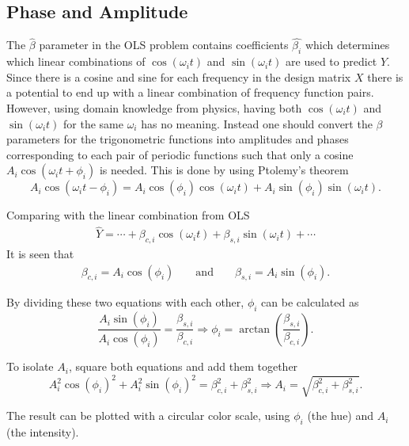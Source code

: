 \subsection{Phase and Amplitude}

The $\hat{\beta}$ parameter in the OLS problem contains coefficients $\hat{\beta_i}$ which determines which linear combinations of $\cos(\omega_i t)$ and $\sin(\omega_i t)$  are used to predict $Y$.
Since there is a cosine and sine for each frequency in the design matrix $X$ there is a potential to end up with a linear combination of frequency function pairs.
However, using domain knowledge from physics, having both $\cos(\omega_i t)$ and $\sin(\omega_i t)$ for the same $\omega_i$ has no meaning.
Instead one should convert the $\beta$ parameters for the trigonometric functions into amplitudes and phases corresponding to each pair of periodic functions such that only a cosine  $A_i \cos(\omega_i t + \phi_i)$ is needed.
This is done by using Ptolemy's theorem
\begin{equation}
A_i \cos(\omega_i t - \phi_i) = A_i \cos(\phi_i) \cos(\omega_i t) + A_i \sin(\phi_i) \sin(\omega_i t).
\end{equation}

Comparing with the linear combination from OLS
\begin{align}
\hat{Y} = \cdots + \beta_{c,i} \cos(\omega_i t) + \beta_{s,i} \sin(\omega_i t) + \cdots
\end{align}
It is seen that
\begin{align}
\beta_{c,i} = A_i \cos(\phi_i) && \text{ and } && \beta_{s,i} = A_i \sin(\phi_i).
\end{align}

By dividing these two equations with each other, $\phi_i$ can be calculated as 
\begin{equation}
\frac{A_i \sin(\phi_i)}{A_i \cos(\phi_i)} = \frac{\beta_{s,i}}{\beta_{c,i}} \Rightarrow \phi_i = \arctan\left(\frac{\beta_{s,i}}{\beta_{c,i}}\right).
\end{equation}

To isolate $A_i$, square both equations and add them together
\begin{equation}
A_i^2 \cos(\phi_i)^2 + A_i^2 \sin(\phi_i)^2 = \beta_{c,i}^2 + \beta_{s,i}^2 \Rightarrow A_i = \sqrt{\beta_{c,i}^2 + \beta_{s,i}^2}.
\end{equation}

The result can be plotted with a circular color scale, using $\phi_i$ (the hue) and $A_i$ (the intensity).
